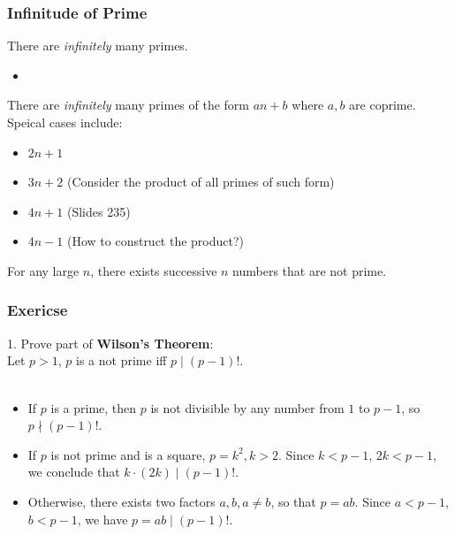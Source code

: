 \documentclass{beamer}
\begin{document}
\begin{frame}
    \frametitle{Infinitude of Prime}
    \hh There are \textit{infinitely} many primes.
    \begin{itemize}
        \item {}
    \end{itemize}
    \vs{0.3em}
    \hh There are \textit{infinitely} many primes of the 
    form $an + b$ where $a, b$ are coprime. Speical cases include:
    \begin{itemize}
        \item $2n+1$
        \item $3n+2$ (Consider the product of all primes of such form)
        \item $4n+1$ (Slides 235)
        \item $4n-1$ (How to construct the product?)
    \end{itemize}
    \vs{0.3em}
    \hh For any large $n$, there exists successive $n$ numbers that are not prime.
\end{frame}
\begin{frame}
    \frametitle{Exericse}
    1. Prove part of \textbf{Wilson's Theorem}: \\\vs{0.3em}
    \hh Let $p>1$,  $p$ is a not prime iff $p \mid (p-1)!$.
    \pause
    \\\vv {}\\
    \begin{itemize}
        \item If $p$ is a prime, then $p$ is not divisible 
        by any number from $1$ to $p-1$, so $p \nmid (p-1)!$.
        \item If $p$ is not prime and is a square, $p=k^2, k>2$. Since $k<p-1$, $2k<p-1$,
         we conclude that $k\cdot (2k) \mid (p-1)!$.
        \item Otherwise, there exists two factors $a,b, a\neq b$, 
        so that $p=ab$. Since $a<p-1$, $b<p-1$, we have $p=ab\mid (p-1)!$.
    \end{itemize}
\end{frame}
\end{document}
